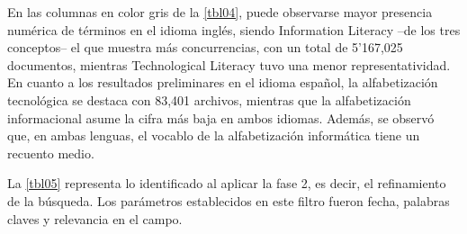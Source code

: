 \documentclass{textolivre}
\begin{document}
En las columnas en color gris de la \cref{tbl04}, puede observarse mayor presencia numérica de términos en el idioma inglés, siendo Information Literacy –de los tres conceptos– el que muestra más concurrencias, con un total de 5’167,025 documentos, mientras Technological Literacy tuvo una menor representatividad. En cuanto a los resultados preliminares en el idioma español, la alfabetización tecnológica se destaca con 83,401 archivos, mientras que la alfabetización informacional asume la cifra más baja en ambos idiomas. Además, se observó que, en ambas lenguas, el vocablo de la alfabetización informática tiene un recuento medio.

La \cref{tbl05} representa lo identificado al aplicar la fase 2, es decir, el refinamiento de la búsqueda. Los parámetros establecidos en este filtro fueron fecha, palabras claves y relevancia en el campo.
\end{document}
